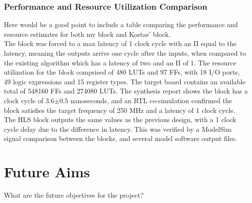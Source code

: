 \documentclass[10pt]{article}
\begin{document}
\subsubsection{Performance and Resource Utilization Comparison}
Here would be a good point to include a table comparing the performance and resource estimates for both my block and Kostas' block.
\\

The block was forced to a max latency of 1 clock cycle with an II equal to the latency, meaning the outputs arrive one cycle after the inputs, when compared to the existing algorithm which has a latency of two and an II of 1.
The resource utilization for the block comprised of 480 LUTs and 97 FFs, with 18 I/O ports, 49 logic expressions and 15 register types. The target board contains an available total of 548160 FFs and 274080 LUTs. The synthesis report shows the block has a clock cycle of 3.6$\pm 0.5$ nanoseconds, and an RTL co-simulation confirmed the block satisfies the target frequency of 250 MHz and a latency of 1 clock cycle. The HLS block outputs the same values as the previous design, with a 1 clock cycle delay due to the difference in latency. This was verified by a ModelSim signal comparison between the blocks, and several model software output files.

\section{Future Aims}

What are the future objectives for the project?



\end{document}
